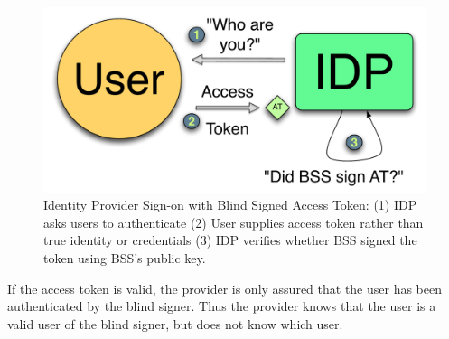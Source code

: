 \documentclass{llncs}
\begin{document}
\begin{figure}
  \centering
  \includegraphics[scale=0.6]{figs/fig-bss-signon-color.pdf}
  \caption{Identity Provider Sign-on with Blind Signed Access Token: (1) IDP asks
  users to authenticate (2) User supplies access token rather than true identity
  or credentials (3) IDP verifies whether BSS signed the token using BSS's
  public key.}
  \label{fig:bss-signon}
\end{figure}

If the access token is valid, the provider is only assured that the
user has been authenticated by the blind signer. Thus the provider
knows that the user is a valid user of the blind signer, but does not
know which user.
\end{document}
